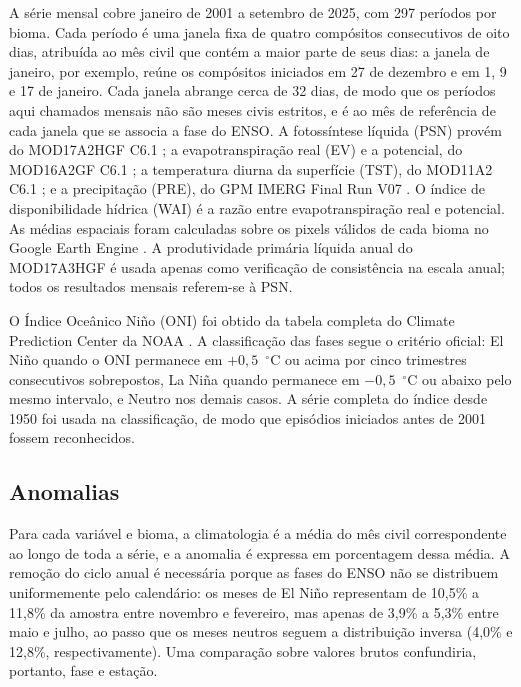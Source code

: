 \documentclass[a4paper,fleqn]{cas-sc}
\begin{document}
A série mensal cobre janeiro de 2001 a setembro de 2025, com 297 períodos por bioma. Cada período é uma janela fixa de quatro compósitos consecutivos de oito dias, atribuída ao mês civil que contém a maior parte de seus dias: a janela de janeiro, por exemplo, reúne os compósitos iniciados em 27 de dezembro e em 1, 9 e 17 de janeiro. Cada janela abrange cerca de 32 dias, de modo que os períodos aqui chamados mensais não são meses civis estritos, e é ao mês de referência de cada janela que se associa a fase do ENSO. A fotossíntese líquida (PSN) provém do MOD17A2HGF C6.1 \citep{running2021gpp}; a evapotranspiração real (EV) e a potencial, do MOD16A2GF C6.1 \citep{running2021et}; a temperatura diurna da superfície (TST), do MOD11A2 C6.1 \citep{wan2021}; e a precipitação (PRE), do GPM IMERG Final Run V07 \citep{huffman2023}. O índice de disponibilidade hídrica (WAI) é a razão entre evapotranspiração real e potencial. As médias espaciais foram calculadas sobre os pixels válidos de cada bioma no Google Earth Engine \citep{gorelick2017}. A produtividade primária líquida anual do MOD17A3HGF é usada apenas como verificação de consistência na escala anual; todos os resultados mensais referem-se à PSN.

O Índice Oceânico Niño (ONI) foi obtido da tabela completa do Climate Prediction Center da NOAA \citep{noaacpc2025}. A classificação das fases segue o critério oficial: El Niño quando o ONI permanece em $+0{,}5$~$^{\circ}$C ou acima por cinco trimestres consecutivos sobrepostos, La Niña quando permanece em $-0{,}5$~$^{\circ}$C ou abaixo pelo mesmo intervalo, e Neutro nos demais casos. A série completa do índice desde 1950 foi usada na classificação, de modo que episódios iniciados antes de 2001 fossem reconhecidos.

\subsection{Anomalias}

Para cada variável e bioma, a climatologia é a média do mês civil correspondente ao longo de toda a série, e a anomalia é expressa em porcentagem dessa média. A remoção do ciclo anual é necessária porque as fases do ENSO não se distribuem uniformemente pelo calendário: os meses de El Niño representam de 10,5\% a 11,8\% da amostra entre novembro e fevereiro, mas apenas de 3,9\% a 5,3\% entre maio e julho, ao passo que os meses neutros seguem a distribuição inversa (4,0\% e 12,8\%, respectivamente). Uma comparação sobre valores brutos confundiria, portanto, fase e estação.
\end{document}
